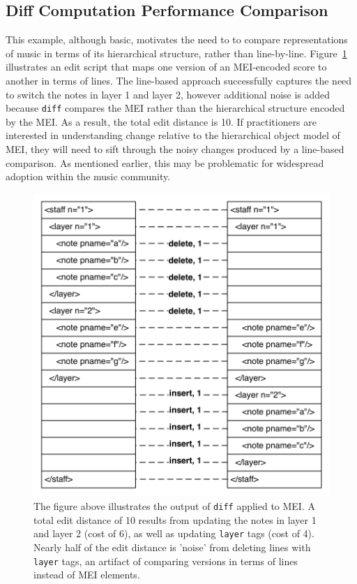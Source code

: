 \documentclass{article}
\newcommand{\code}[1]{\texttt{#1}}
\begin{document}
\subsection{Diff Computation Performance Comparison}
This example, although basic, motivates the need to to compare representations of music in terms of its 
hierarchical structure, rather than line-by-line. Figure~\ref{fig:lcs-diff} illustrates an edit script that maps one
version of an MEI-encoded score to another in terms of lines.
The line-based approach successfully captures the need to switch the
notes in layer 1 and layer 2, however additional noise is added
because \code{diff} compares the MEI rather than the hierarchical
structure encoded by the MEI.  As a result, the total edit distance is
10.  If practitioners are interested in understanding change relative
to the hierarchical object model of MEI, they will need to sift
through the noisy changes produced by a line-based comparison.  As
mentioned earlier, this may be problematic for widespread adoption
within the music community.

\begin{figure}[ht]
\centering
\includegraphics[scale=0.5]{figures/lcs-diff.pdf}
\caption{The figure above illustrates the output of \code{diff}
  applied to MEI.  A total edit distance of 10 results from updating
  the notes in layer 1 and layer 2 (cost of 6), as well as updating
  \code{layer} tags (cost of 4).  Nearly half of the edit distance is
  'noise' from deleting lines with \code{layer} tags, an artifact of
  comparing versions in terms of lines instead of MEI elements.}
\label{fig:lcs-diff}
\end{figure}
\end{document}
